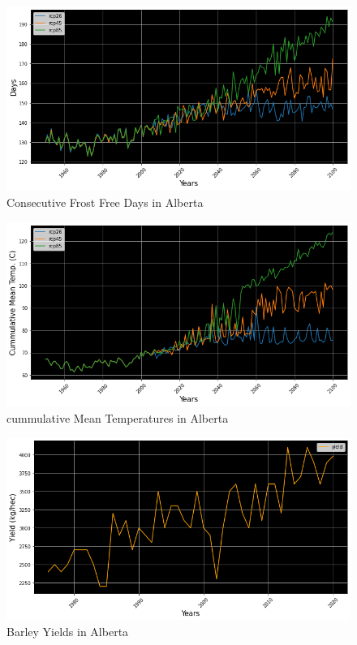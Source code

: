\documentclass[11pt]{article}
\numberwithin{equation}{section}
\begin{document}
\begin{figure}[h!]
\centering
\includegraphics[scale=0.4]{ABfrost}
\caption{Consecutive Frost Free Days in Alberta}
\label{ABfrostdays}
\end{figure}

\begin{figure}[h!]
\centering
 \includegraphics[scale=0.4]{ABtemp}
 \caption{cummulative Mean Temperatures in Alberta}
 \label{ABmeantemp}
\end{figure}

\begin{figure}[h!]
\centering
 \includegraphics[scale=0.4]{AByield}
 \caption{Barley Yields in Alberta}
 \label{ABbarleyyields}
\end{figure}
\end{document}
